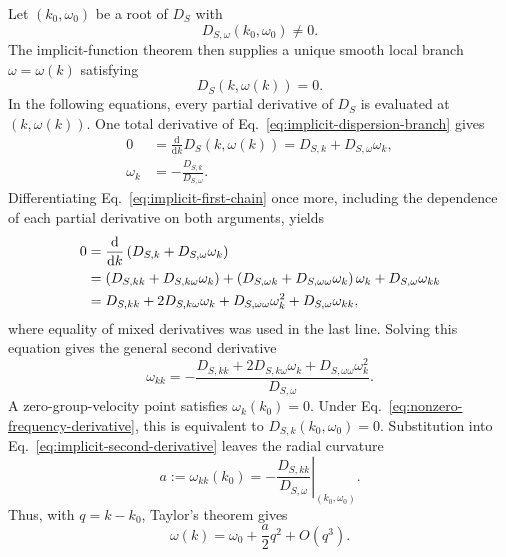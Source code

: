 Let \((k_0,\omega_0)\) be a root of \(D_S\) with
\begin{equation}
  D_{S,\omega}(k_0,\omega_0)\neq0.
  \label{eq:nonzero-frequency-derivative}
\end{equation}
The implicit-function theorem then supplies a unique smooth local branch
\(\omega=\omega(k)\) satisfying
\begin{equation}
  D_S(k,\omega(k))=0.
  \label{eq:implicit-dispersion-branch}
\end{equation}
In the following equations, every partial derivative of \(D_S\) is evaluated
at \((k,\omega(k))\).  One total derivative of
Eq.~\eqref{eq:implicit-dispersion-branch} gives
\begin{align}
  0
  &=\frac{\mathrm{d}}{\mathrm{d}k}D_S(k,\omega(k))
    =D_{S,k}+D_{S,\omega}\omega_k,                                  \label{eq:implicit-first-chain}\\
  \omega_k
  &=-\frac{D_{S,k}}{D_{S,\omega}}.                                  \label{eq:implicit-first-derivative}
\end{align}
Differentiating Eq.~\eqref{eq:implicit-first-chain} once more, including the
dependence of each partial derivative on both arguments, yields
\begin{align}
  0
  &=\frac{\mathrm{d}}{\mathrm{d}k}
    \left(D_{S,k}+D_{S,\omega}\omega_k\right)                         \notag\\
  &=\left(D_{S,kk}+D_{S,k\omega}\omega_k\right)
   +\left(D_{S,\omega k}+D_{S,\omega\omega}\omega_k\right)\omega_k
   +D_{S,\omega}\omega_{kk}                                         \notag\\
  &=D_{S,kk}+2D_{S,k\omega}\omega_k
    +D_{S,\omega\omega}\omega_k^2+D_{S,\omega}\omega_{kk},
  \label{eq:implicit-second-chain}
\end{align}
where equality of mixed derivatives was used in the last line.  Solving this
equation gives the general second derivative
\begin{equation}
  \omega_{kk}
  =-\frac{D_{S,kk}+2D_{S,k\omega}\omega_k
          +D_{S,\omega\omega}\omega_k^2}
         {D_{S,\omega}}.
  \label{eq:implicit-second-derivative}
\end{equation}
A zero-group-velocity point satisfies \(\omega_k(k_0)=0\).  Under
Eq.~\eqref{eq:nonzero-frequency-derivative}, this is equivalent to
\(D_{S,k}(k_0,\omega_0)=0\).  Substitution into
Eq.~\eqref{eq:implicit-second-derivative} leaves the radial curvature
\begin{equation}
  a:=\omega_{kk}(k_0)
  =-\left.\frac{D_{S,kk}}{D_{S,\omega}}
    \right|_{(k_0,\omega_0)}.
  \label{eq:zgv-curvature}
\end{equation}
Thus, with \(q=k-k_0\), Taylor's theorem gives
\begin{equation}
  \omega(k)=\omega_0+\frac{a}{2}q^2+O(q^3).
  \label{eq:isotropic-radial-normal-form}
\end{equation}


